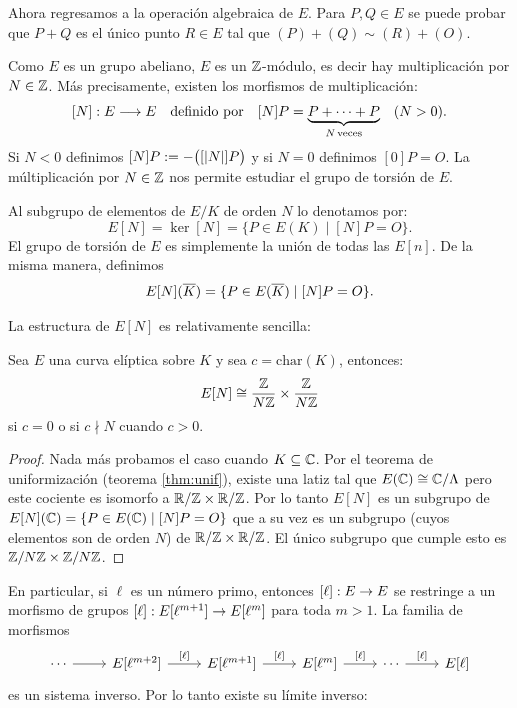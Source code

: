 Ahora regresamos a la operaci\'on algebraica de $E$. Para $P,Q\in E$ se puede probar que $P+Q$ es
el \'unico punto $R\in E$ tal que $(P)+(Q)\sim (R)+(O)$.

Como $E$ es un grupo abeliano, $E$ es un $\mathbb{Z}$-m\'odulo, es decir hay multiplicaci\'on por $N\in\mathbb{Z}$.
M\'as precisamente, existen los morfismos de multiplicaci\'on:
\[
  [N]:E\longrightarrow E \quad\text{definido por}\quad
  [N]P=\underset{N\,\text{veces}}{\underbrace{P+\cdots+P}}\quad(N>0).
\]
Si $N<0$ definimos $[N]P:=-\big([\left| N \right|]P\big)$ y si $N=0$ definimos $[0]P=O$. La m\'ultiplicaci\'on
por $N\in\mathbb{Z}$ nos permite estudiar el grupo de torsi\'on de $E$.

\begin{defin}
  Al subgrupo de elementos de $E/K$ de orden $N$ lo denotamos por:
  \[
    E[N]=\ker[N]=\{P\in E(K)\mid [N]P=O\}.
  \]
  El grupo de torsi\'on de $E$ es simplemente la uni\'on de todas las $E[n]$. De la misma
  manera, definimos
  \[
    E[N](\overline{K})=\{P\in E(\overline{K})\mid [N]P=O\}.
  \]
\end{defin}

La estructura de $E[N]$ es relativamente sencilla:

\begin{prop}\label{prop:estructura_EN}
  Sea $E$ una curva el\'iptica sobre $K$ y sea $c=\mathrm{char}(K)$, entonces:
  \[
    E[N]\cong \frac{\mathbb{Z}}{N\mathbb{Z}}\times\frac{\mathbb{Z}}{N\mathbb{Z}}
  \]
  si $c=0$ o si $c\nmid N$ cuando $c>0$.
\end{prop}

\begin{proof}
  Nada m\'as probamos el caso cuando $K\subseteq\mathbb{C}$. Por el teorema de uniformizaci\'on
  (teorema \ref{thm:unif}), existe una latiz tal que $E(\mathbb{C})\cong\mathbb{C}/\Lambda$ pero este cociente
  es isomorfo a $\mathbb{R}/\mathbb{Z}\times\mathbb{R}/\mathbb{Z}$. Por lo tanto $E[N]$ es un subgrupo
  de $E[N](\mathbb{C})=\{P\in E(\mathbb{C})\mid [N]P=O\}$ que a su vez es un subgrupo (cuyos elementos son de orden
  $N$) de $\mathbb{R}/\mathbb{Z}\times\mathbb{R}/\mathbb{Z}$. El \'unico subgrupo que cumple esto es $\mathbb{Z}/N\mathbb{Z}\times\mathbb{Z}/N\mathbb{Z}$.
\end{proof}

En particular, si $\ell$ es un n\'umero primo, entonces $[\ell]:E\rightarrow E$ se restringe a un morfismo
de grupos $[\ell]:E[\ell^{m+1}]\rightarrow E[\ell^m]$ para toda $m>1$. La familia de morfismos
\[
  \begin{tikzcd}
    \cdots \arrow[r] & E\text{[}\ell^{m+2}\text{]} \arrow[r,"\text{[}\ell\text{]}"] &
    E\text{[}\ell^{m+1}\text{]} \arrow[r,"\text{[}\ell\text{]}"] &
    E\text{[}\ell^{m}\text{]} \arrow[r,"\text{[}\ell\text{]}"] &
    \cdots \arrow[r,"\text{[}\ell\text{]}"] & E\text{[}\ell\text{]}
  \end{tikzcd}
\]
es un sistema inverso. Por lo tanto existe su l\'imite inverso:

